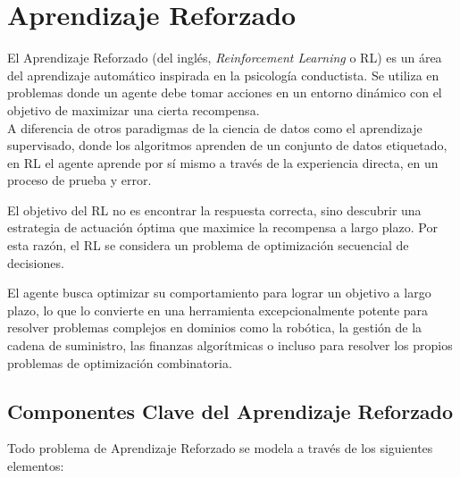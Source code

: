 \documentclass[12pt,a4paper]{book}
\begin{document}
\section{Aprendizaje Reforzado}

El Aprendizaje Reforzado \citep{intro_reforzado} (del inglés, \textit{Reinforcement Learning} o RL) es un área del aprendizaje automático inspirada en la psicología conductista. Se utiliza en problemas donde un agente debe tomar acciones en un entorno dinámico con el objetivo de maximizar una cierta recompensa.\\
A diferencia de otros paradigmas de la ciencia de datos como el aprendizaje supervisado, donde los algoritmos aprenden de un conjunto de datos etiquetado, en RL el agente aprende por sí mismo a través de la experiencia directa, en un proceso de prueba y error. 

El objetivo del RL no es encontrar la respuesta correcta, sino descubrir una estrategia de actuación óptima que maximice la recompensa a largo plazo. Por esta razón, el RL se considera un problema de optimización secuencial de decisiones.

El agente busca optimizar su comportamiento para lograr un objetivo a largo plazo, lo que lo convierte en una herramienta excepcionalmente potente para resolver problemas complejos en dominios como la robótica, la gestión de la cadena de suministro, las finanzas algorítmicas o incluso para resolver los propios problemas de optimización combinatoria.

\subsection{Componentes Clave del Aprendizaje Reforzado}

Todo problema de Aprendizaje Reforzado se modela a través de los siguientes elementos:
\end{document}
